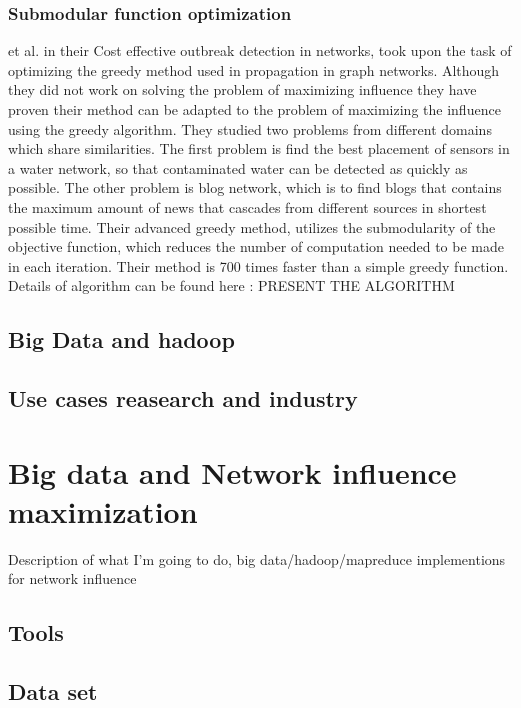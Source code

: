\documentclass[english]{tktltiki}
\begin{document}
\subsubsection{Submodular function optimization}
\cite{Leskovec07} et al. in their Cost effective outbreak detection in networks, took upon the task of optimizing the greedy method used in propagation in graph networks. Although they did not work on solving the problem of maximizing influence they have proven their method can be adapted to the problem of maximizing the influence using the greedy algorithm. They studied two problems from different domains which share similarities. The first problem is find the best placement of sensors in a water network, so that contaminated water can be detected as quickly as possible. The other problem is blog network, which is to find blogs that contains the maximum amount of news that cascades from different sources in shortest possible time. Their advanced greedy method, utilizes the submodularity of the objective function, which reduces the number of computation needed to be made in each iteration. Their method is 700 times faster than a simple greedy function. Details of algorithm can be found here :
PRESENT THE ALGORITHM






\subsection{Big Data and hadoop}


\subsection{Use cases reasearch and industry}



\section{Big data and Network influence maximization}

Description of what I'm going to do, big data/hadoop/mapreduce implementions for network influence


\subsection{Tools}




\subsection{Data set}
\end{document}
